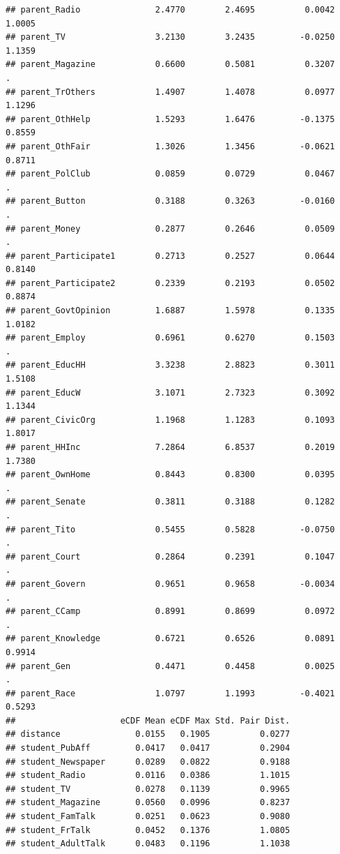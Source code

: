\documentclass[
]{article}
\begin{document}
\begin{verbatim}
## parent_Radio               2.4770        2.4695          0.0042     1.0005
## parent_TV                  3.2130        3.2435         -0.0250     1.1359
## parent_Magazine            0.6600        0.5081          0.3207          .
## parent_TrOthers            1.4907        1.4078          0.0977     1.1296
## parent_OthHelp             1.5293        1.6476         -0.1375     0.8559
## parent_OthFair             1.3026        1.3456         -0.0621     0.8711
## parent_PolClub             0.0859        0.0729          0.0467          .
## parent_Button              0.3188        0.3263         -0.0160          .
## parent_Money               0.2877        0.2646          0.0509          .
## parent_Participate1        0.2713        0.2527          0.0644     0.8140
## parent_Participate2        0.2339        0.2193          0.0502     0.8874
## parent_GovtOpinion         1.6887        1.5978          0.1335     1.0182
## parent_Employ              0.6961        0.6270          0.1503          .
## parent_EducHH              3.3238        2.8823          0.3011     1.5108
## parent_EducW               3.1071        2.7323          0.3092     1.1344
## parent_CivicOrg            1.1968        1.1283          0.1093     1.8017
## parent_HHInc               7.2864        6.8537          0.2019     1.7380
## parent_OwnHome             0.8443        0.8300          0.0395          .
## parent_Senate              0.3811        0.3188          0.1282          .
## parent_Tito                0.5455        0.5828         -0.0750          .
## parent_Court               0.2864        0.2391          0.1047          .
## parent_Govern              0.9651        0.9658         -0.0034          .
## parent_CCamp               0.8991        0.8699          0.0972          .
## parent_Knowledge           0.6721        0.6526          0.0891     0.9914
## parent_Gen                 0.4471        0.4458          0.0025          .
## parent_Race                1.0797        1.1993         -0.4021     0.5293
##                     eCDF Mean eCDF Max Std. Pair Dist.
## distance               0.0155   0.1905          0.0277
## student_PubAff         0.0417   0.0417          0.2904
## student_Newspaper      0.0289   0.0822          0.9188
## student_Radio          0.0116   0.0386          1.1015
## student_TV             0.0278   0.1139          0.9965
## student_Magazine       0.0560   0.0996          0.8237
## student_FamTalk        0.0251   0.0623          0.9080
## student_FrTalk         0.0452   0.1376          1.0805
## student_AdultTalk      0.0483   0.1196          1.1038

\end{verbatim}
\end{document}
